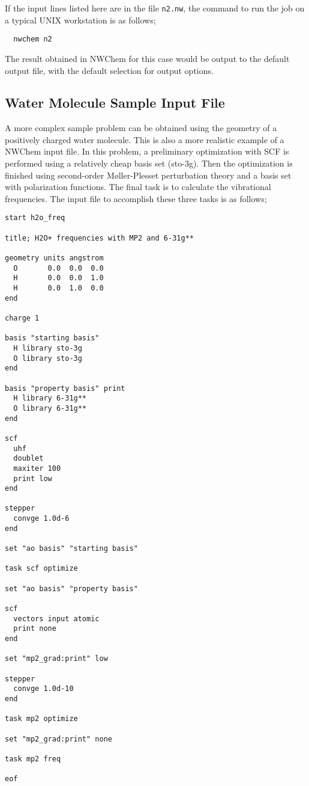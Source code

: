 If the input lines listed here are in the file \verb+n2.nw+, 
the command to run the job on
a typical UNIX workstation is as follows;

\begin{verbatim}
  nwchem n2
\end{verbatim}

The result obtained in NWChem for this case would be output to the
default output file, with the default selection for output options.

\subsection{Water Molecule Sample Input File}
\label{sec:realsample}

A more complex sample problem can be obtained using the geometry of
a positively charged water molecule.  This is also a more realistic example
of a NWChem input file.  In this problem, a preliminary optimization
with SCF is performed using a relatively cheap basis set (sto-3g).  Then 
the optimization is finished using second-order M{\o}ller-Plesset 
perturbation theory and a basis set with polarization functions. 
The final task is to calculate the vibrational frequencies.
The input file to accomplish these three tasks is as follows;

\begin{verbatim}
start h2o_freq

title; H2O+ frequencies with MP2 and 6-31g**

geometry units angstrom
  O       0.0  0.0  0.0
  H       0.0  0.0  1.0
  H       0.0  1.0  0.0
end

charge 1

basis "starting basis"
  H library sto-3g
  O library sto-3g
end

basis "property basis" print
  H library 6-31g**
  O library 6-31g**
end

scf
  uhf
  doublet
  maxiter 100
  print low
end

stepper
  convge 1.0d-6
end

set "ao basis" "starting basis"

task scf optimize

set "ao basis" "property basis"

scf
  vectors input atomic
  print none
end

set "mp2_grad:print" low

stepper
  convge 1.0d-10
end

task mp2 optimize

set "mp2_grad:print" none

task mp2 freq

eof
\end{verbatim}

